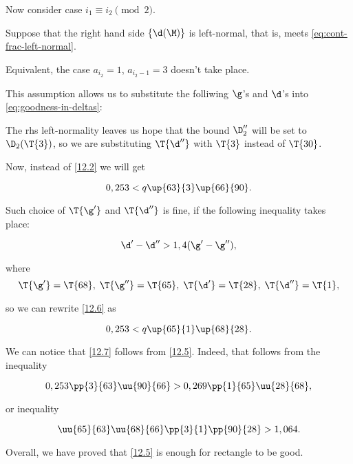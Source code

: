 Now consider case $i_1 \equiv i_2 \pmod 2$.

Suppose that the right hand side $\{\d(\M)\}$ is left-normal,
that is, meets \ref{eq:cont-frac-left-normal}.

Equivalent, the case $a_{i_2} = 1$, $a_{i_2 - 1} = 3$ doesn't take place.


This assumption allows us to substitute the folliwing $\g$'s and $\d$'s
into \ref{eq:goodness-in-deltas}:
%

The rhs left-normality leaves us hope that the bound $\D_2''$
will be set to $\D_2(\T{3})$,
so we are substituting $\T{\d''}$ with $\T{3}$ instead of $\T{30}$.

Now, instead of \ref{12.2} we will get

\begin{equation}\label{12.5}
	0,253 < q \up{63}{3} \up{66}{90}.
\end{equation}

Such choice of $\T{\g'}$ and $\T{\d''}$ is fine,
if the following inequality takes place:

\begin{equation}\label{12.6}
	\d' - \d'' > 1,4 (\g' - \g''),
\end{equation}

where 
\begin{equation*}
	\T{\g'} = \T{68},\;
	\T{\g''} = \T{65},\;
	\T{\d'} = \T{28},\;
	\T{\d''} = \T{1},
\end{equation*}

so we can rewrite \ref{12.6} as

\begin{equation}\label{12.7}
	0,253 < q \up{65}{1} \up{68}{28}.
\end{equation}

We can notice that \ref{12.7} follows from \ref{12.5}. Indeed, that follows from the inequality

\begin{equation*}
	0,253 \pp{3}{63} \uu{90}{66}
	>
	0,269 \pp{1}{65} \uu{28}{68},
\end{equation*}

or inequality

\begin{equation*}
	\uu{65}{63} \uu{68}{66} \pp{3}{1} \pp{90}{28}
	>
	1,064.
\end{equation*}

Overall, we have proved that \ref{12.5} is enough for rectangle to be good.

